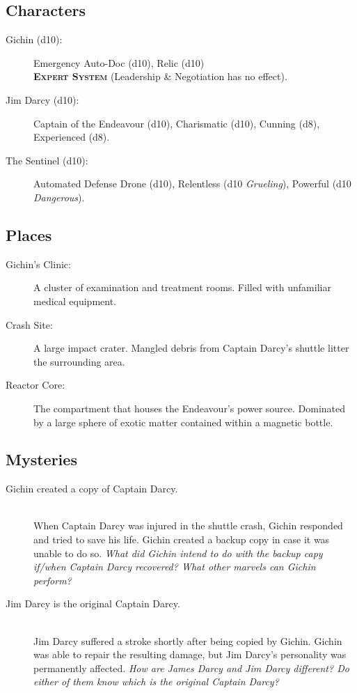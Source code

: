 \documentclass[11pt, a5paper, parskip=half-, DIV=12]{scrartcl}
\begin{document}
\subsection*{Characters}
\begin{description}
	\item[Gichin (d10):] Emergency Auto-Doc (d10), Relic (d10)\\\textbf{\textsc{Expert System}} (Leadership \& Negotiation has no effect).
	\item[Jim Darcy (d10):] Captain of the Endeavour (d10), Charismatic (d10), Cunning (d8), Experienced (d8).
	\item[The Sentinel (d10):] Automated Defense Drone (d10), Relentless (d10 \textit{Grueling}), Powerful (d10 \textit{Dangerous}).

\end{description}

\subsection*{Places}
\begin{description}
	\item[Gichin's Clinic:] A cluster of examination and treatment rooms. Filled with unfamiliar medical equipment.
	\item[Crash Site:] A large impact crater. Mangled debris from Captain Darcy's shuttle litter the surrounding area.
	\item[Reactor Core:] The compartment that houses the Endeavour's power source. Dominated by a large sphere of exotic matter contained within a magnetic bottle.
\end{description}

\subsection*{Mysteries}
\begin{description}
	\item[Gichin created a copy of Captain Darcy.] \phantom{a} \\ When Captain Darcy was injured in the shuttle crash, Gichin responded and tried to save his life. Gichin created a backup copy in case it was unable to do so. \textit{What did Gichin intend to do with the backup capy if/when Captain Darcy recovered? What other marvels can Gichin perform?}
	\item[Jim Darcy is the original Captain Darcy.] \phantom{a} \\
	Jim Darcy suffered a stroke shortly after being copied by Gichin. Gichin was able to repair the resulting damage, but Jim Darcy's personality was permanently affected. \textit{How are James Darcy and Jim Darcy different? Do either of them know which is the original Captain Darcy?} 
\end{description}
\end{document}
